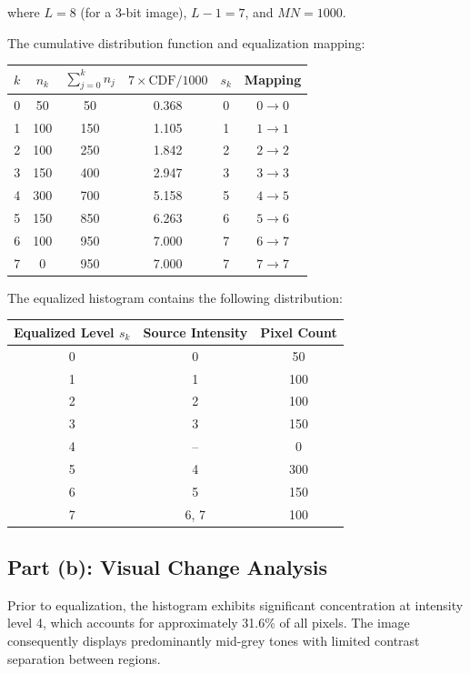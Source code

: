 \documentclass[12pt,a4paper]{article}
\begin{document}
where $L = 8$ (for a 3-bit image), $L - 1 = 7$, and $MN = 1000$.

The cumulative distribution function and equalization mapping:

\begin{center}
\begin{tabular}{|c|c|c|c|c|c|}
\hline
$k$ & $n_k$ & $\sum_{j=0}^k n_j$ & $7 \times \text{CDF}/1000$ & $s_k$ & Mapping \\
\hline
0 & 50 & 50 & 0.368 & 0 & $0 \to 0$ \\
1 & 100 & 150 & 1.105 & 1 & $1 \to 1$ \\
2 & 100 & 250 & 1.842 & 2 & $2 \to 2$ \\
3 & 150 & 400 & 2.947 & 3 & $3 \to 3$ \\
4 & 300 & 700 & 5.158 & 5 & $4 \to 5$ \\
5 & 150 & 850 & 6.263 & 6 & $5 \to 6$ \\
6 & 100 & 950 & 7.000 & 7 & $6 \to 7$ \\
7 & 0 & 950 & 7.000 & 7 & $7 \to 7$ \\
\hline
\end{tabular}
\end{center}

The equalized histogram contains the following distribution:

\begin{center}
\begin{tabular}{|c|c|c|}
\hline
\textbf{Equalized Level } $s_k$ & \textbf{Source Intensity} & \textbf{Pixel Count} \\
\hline
0 & 0 & 50 \\
1 & 1 & 100 \\
2 & 2 & 100 \\
3 & 3 & 150 \\
4 & -- & 0 \\
5 & 4 & 300 \\
6 & 5 & 150 \\
7 & 6, 7 & 100 \\
\hline
\end{tabular}
\end{center}

\subsection*{Part (b): Visual Change Analysis}

Prior to equalization, the histogram exhibits significant concentration at intensity level 4, which accounts for approximately 31.6\% of all pixels. The image consequently displays predominantly mid-grey tones with limited contrast separation between regions.
\end{document}
